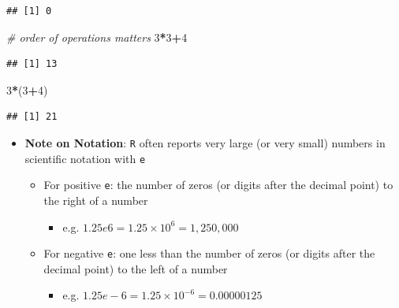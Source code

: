 \documentclass[]{book}
\newenvironment{Shaded}{\begin{snugshade}}{\end{snugshade}}
\newcommand{\DecValTok}[1]{\textcolor[rgb]{0.00,0.00,0.81}{#1}}
\newcommand{\CommentTok}[1]{\textcolor[rgb]{0.56,0.35,0.01}{\textit{#1}}}
\newcommand{\OperatorTok}[1]{\textcolor[rgb]{0.81,0.36,0.00}{\textbf{#1}}}
\newcommand{\NormalTok}[1]{#1}
\providecommand{\tightlist}{%
  \setlength{\itemsep}{0pt}\setlength{\parskip}{0pt}}
\theoremstyle{definition}
\theoremstyle{definition}
\theoremstyle{definition}
\theoremstyle{remark}
\begin{document}
\begin{verbatim}
## [1] 0
\end{verbatim}

\begin{Shaded}
\begin{Highlighting}[]
\CommentTok{# order of operations matters}
\DecValTok{3}\OperatorTok{*}\DecValTok{3}\OperatorTok{+}\DecValTok{4}
\end{Highlighting}
\end{Shaded}

\begin{verbatim}
## [1] 13
\end{verbatim}

\begin{Shaded}
\begin{Highlighting}[]
\DecValTok{3}\OperatorTok{*}\NormalTok{(}\DecValTok{3}\OperatorTok{+}\DecValTok{4}\NormalTok{)}
\end{Highlighting}
\end{Shaded}

\begin{verbatim}
## [1] 21
\end{verbatim}

\begin{itemize}
\tightlist
\item
  \textbf{Note on Notation}: \texttt{R} often reports very large (or
  very small) numbers in scientific notation with \texttt{e}

  \begin{itemize}
  \tightlist
  \item
    For positive \texttt{e}: the number of zeros (or digits after the
    decimal point) to the right of a number

    \begin{itemize}
    \tightlist
    \item
      e.g. \(1.25e6 = 1.25 \times 10^6 = 1,250,000\)
    \end{itemize}
  \item
    For negative \texttt{e}: one less than the number of zeros (or
    digits after the decimal point) to the left of a number

    \begin{itemize}
    \tightlist
    \item
      e.g. \(1.25e-6 = 1.25 \times 10^{-6} = 0.00000125\)
    \end{itemize}
  \end{itemize}
\end{itemize}
\end{document}
